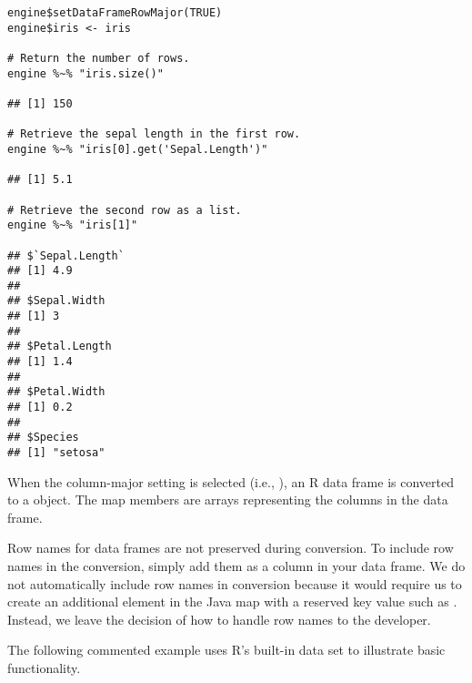 \begin{verbatim}
engine$setDataFrameRowMajor(TRUE)
engine$iris <- iris

# Return the number of rows.
engine %~% "iris.size()"

## [1] 150

# Retrieve the sepal length in the first row.
engine %~% "iris[0].get('Sepal.Length')"

## [1] 5.1

# Retrieve the second row as a list.
engine %~% "iris[1]"

## $`Sepal.Length`
## [1] 4.9
##
## $Sepal.Width
## [1] 3
##
## $Petal.Length
## [1] 1.4
##
## $Petal.Width
## [1] 0.2
##
## $Species
## [1] "setosa"
\end{verbatim}

When the column-major setting is selected (i.e., ), an R data frame is converted to a \href{https://docs.oracle.com/javase/8/docs/api/java/util/LinkedHashMap.html}{} object. The map members are arrays representing the columns in the data frame.

Row names for data frames are not preserved during conversion. To include row names in the conversion, simply add them as a column in your data frame. We do not automatically include row names in conversion because it would require us to create an additional element in the Java map with a reserved key value such as . Instead, we leave the decision of how to handle row names to the developer.

The following commented example uses R's built-in  data set to illustrate basic functionality.

